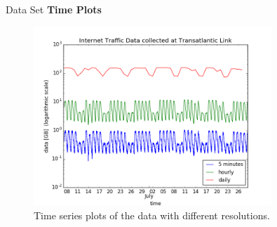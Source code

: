 \documentclass{beamer}
\begin{document}
  \begin{frame}{Data Set}
   \textbf{Time Plots}
   \begin{figure}
       \includegraphics[width=0.8\textwidth]{images/datasets.png}
       \caption{Time series plots of the data with different resolutions.}
      \end{figure}
  \end{frame}
  
\end{document}
